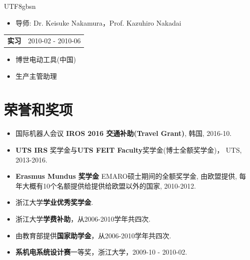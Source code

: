 \documentclass[margin,line]{res}
\begin{document}
\begin{CJK*}{UTF8}{gbsn}
\begin{resume}
\begin{itemize}
\vspace*{-2.5mm}
\item[] 导师: Dr. Keisuke Nakamura，Prof. Kazuhiro Nakadai
\end{itemize}

\begin{tabularx}{\textwidth}{X r}
{\bf 实习} & 2010-02 - 2010-06\\
\end{tabularx}
\begin{itemize}
\item[] 博世电动工具(中国)

\vspace*{-2.5mm}
\item[] 生产主管助理
\end{itemize}

\section{\sc 荣誉和奖项} 
\begin{itemize}

\item 国际机器人会议 {\bf IROS 2016 交通补助(Travel Grant)}, 韩国, 2016-10.

\item {\bf UTS IRS} %
奖学金与{\bf UTS FEIT Faculty}奖学金(博士全额奖学金)， UTS, 2013-2016.

%
\item {\bf Erasmus Mundus 奖学金} EMARO硕士期间的全额奖学金, 由欧盟提供, 每年大概有10个名额提供给提供给欧盟以外的国家, 2010-2012.

\item 浙江大学{\bf 学业优秀奖学金}.

\item 浙江大学{\bf 学费补助}，从2006-2010学年共四次.

\item 由教育部提供{\bf 国家助学金}，从2006-2010学年共四次.

\item {\bf 系机电系统设计赛}一等奖，浙江大学，2009-10 - 2010-02.


\end{itemize}
\end{resume}
\end{CJK*}
\end{document}
